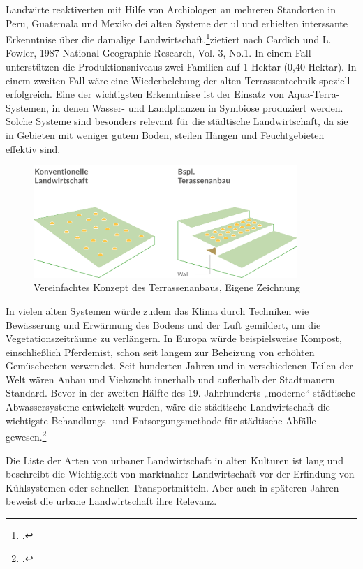 \documentclass{scrartcl}
\begin{document}
Landwirte reaktiverten mit Hilfe von Archiologen an mehreren Standorten in Peru, Guatemala und Mexiko dei alten Systeme der \acs{ul} und erhielten interssante Erkenntnise über die damalige Landwirtschaft.\footcite[Vgl.][S. 6]{Smit2001UrbanCities}{zietiert nach Cardich und L. Fowler, 1987 National Geographic Research, Vol. 3, No.1.}
In einem Fall unterstützen die Produktionsniveaus zwei Familien auf 1 Hektar (0,40 Hektar). In einem zweiten Fall wäre eine Wiederbelebung der alten Terrassentechnik speziell erfolgreich. Eine der wichtigsten Erkenntnisse ist der Einsatz von Aqua-Terra-Systemen, in denen Wasser- und Landpflanzen in Symbiose produziert werden. Solche Systeme sind besonders relevant für die städtische Landwirtschaft, da sie in Gebieten mit weniger gutem Boden, steilen Hängen und Feuchtgebieten effektiv sind. 

\begin{figure}[htbp]
\centering
\includegraphics[width=10cm]{image_folder/SchaubildTerassenanbau.png}
\caption{Vereinfachtes Konzept des Terrassenanbaus, Eigene Zeichnung}
\label{fig:Terassenlandwirtschaft}
\end{figure}

In vielen alten Systemen würde zudem das Klima durch Techniken wie Bewässerung und Erwärmung des Bodens und der Luft gemildert, um die Vegetationszeiträume zu verlängern. In Europa würde beispielsweise Kompost, einschließlich Pferdemist, schon seit langem zur Beheizung von erhöhten Gemüsebeeten verwendet. Seit hunderten Jahren und in verschiedenen Teilen der Welt wären Anbau und Viehzucht innerhalb und außerhalb der Stadtmauern Standard. Bevor in der zweiten Hälfte des 19. Jahrhunderts „moderne“ städtische Abwassersysteme entwickelt wurden, wäre die städtische Landwirtschaft die wichtigste Behandlungs- und Entsorgungsmethode für städtische Abfälle gewesen.\footcite[Vgl.][S. 6-7]{Smit2001UrbanCities}

Die Liste der Arten von urbaner Landwirtschaft in alten Kulturen ist lang und beschreibt die Wichtigkeit von marktnaher Landwirtschaft vor der Erfindung von Kühlsystemen oder schnellen Transportmitteln. Aber auch in späteren Jahren beweist die urbane Landwirtschaft ihre Relevanz.
\end{document}

